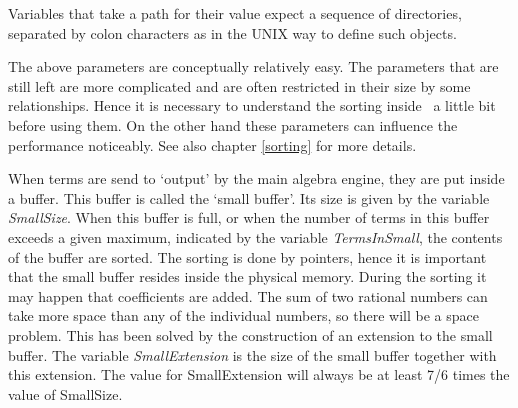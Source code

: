 



Variables that take a path for their value expect a sequence of 
directories, separated by colon characters as in the UNIX way 
to define such objects.

The above parameters are conceptually relatively easy. The parameters that 
are still left are more complicated and are often restricted in their 
size by some relationships. Hence it is necessary to understand the 
sorting inside \FORM\ a little bit before using them. On the other hand 
these parameters can influence the performance noticeably. See also chapter 
\ref{sorting} for more details.

When terms are send to `output' by the main algebra engine, they are put 
inside a buffer. This buffer is called the `small 
buffer'. Its size is given by the variable {\sl 
SmallSize}. When this buffer is full, or when the number 
of terms in this buffer exceeds a given maximum, indicated by the variable 
{\sl TermsInSmall}, the contents of the buffer are 
sorted. The sorting is done by pointers, hence it is important that the 
small buffer resides inside the physical memory. During the sorting it may 
happen that coefficients are added. The sum of two rational numbers can 
take more space than any of the individual numbers, so there will be a 
space problem. This has been solved by the construction of an extension to 
the small buffer. The variable {\sl SmallExtension} 
is the size of the small buffer together with this extension. The value for 
SmallExtension will always be at least 7/6 times the value of SmallSize.


